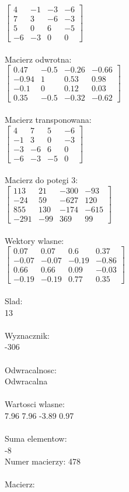 \documentclass[a4paper,12pt]{article}
\begin{document}
$\begin{bmatrix} 4&-1&-3&-6\\7&3&-6&-3\\5&0&6&-5\\-6&-3&0&0 \end{bmatrix}$
\\
\\
Macierz odwrotna:\\

$\begin{bmatrix} 0.47&-0.5&-0.26&-0.66\\-0.94&1&0.53&0.98\\-0.1&0&0.12&0.03\\0.35&-0.5&-0.32&-0.62 \end{bmatrix}$
\\
\\
Macierz transponowana:\\

$\begin{bmatrix} 4&7&5&-6\\-1&3&0&-3\\-3&-6&6&0\\-6&-3&-5&0 \end{bmatrix}$
\\
\\
Macierz do potegi 3:\\

$\begin{bmatrix} 113&21&-300&-93\\-24&59&-627&120\\855&130&-174&-615\\-291&-99&369&99 \end{bmatrix}$
\\
\\
Wektory wlasne:\\

$\begin{bmatrix} 0.07&0.07&0.6&0.37\\-0.07&-0.07&-0.19&-0.86\\0.66&0.66&0.09&-0.03\\-0.19&-0.19&0.77&0.35 \end{bmatrix}$
\\
\\
Slad:\\
13
\\
\\
Wyznacznik:\\
-306
\\
\\
Odwracalnosc:\\
Odwracalna
\\
\\
Wartosci wlasne:\\
7.96 7.96 -3.89 0.97
\\
\\
Suma elementow:\\
-8
\\
\newpage
Numer macierzy:
478
\\
\\
Macierz:\\
\end{document}
